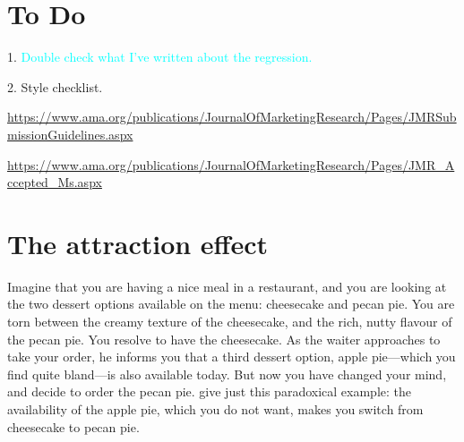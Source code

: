 \documentclass[12pt, a4paper]{article}
\newcommand{\AT}[1] {{\textcolor{cyan}{#1}}}
\begin{document}
\section{To Do}

1. \AT{Double check what I've written about the regression.}



2. Style checklist.


\AT{\url{https://www.ama.org/publications/JournalOfMarketingResearch/Pages/JMRSubmissionGuidelines.aspx}}

\AT{\url{https://www.ama.org/publications/JournalOfMarketingResearch/Pages/JMR_Accepted_Ms.aspx}}






\newpage


\section*{The attraction effect}


Imagine that you are having a nice meal in a restaurant, and you are looking at the two dessert options available on the menu: cheesecake and pecan pie. You are torn between the creamy texture of the cheesecake, and the rich, nutty flavour of the pecan pie. You resolve to have the cheesecake. As the waiter approaches to take your order, he informs you that a third dessert option, apple pie---which you find quite bland---is also available today. But now you have changed your mind, and decide to order the pecan pie.  give just this paradoxical example: the availability of the apple pie, which you do not want, makes you switch from cheesecake to pecan pie.
\end{document}
